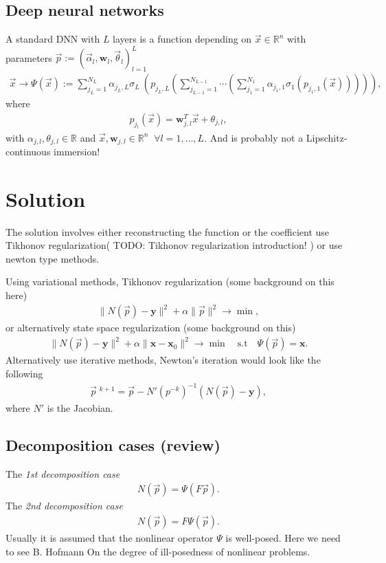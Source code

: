 \subsection{Deep neural networks}
A standard DNN with $L$ layers is a function depending on $\vec{x} \in
\mathbb{R}^{n}$ with parameters $\vec{p}:=\left( \vec{\alpha}_l,
\mathbf{w}_l, \vec{\theta}_l  \right)_{l=1}^{L}$
\begin{align}
    \vec{x}\to\Psi(\vec{x}) := \sum_{j_L=1}^{N_L} \alpha_{j_L,L}\sigma_L\
    \left( p_{j_L, L} \left( \sum_{j_{L-1}=1}^{N_{L-1}}\cdots
    \left( \sum_{j_1=1}^{N_1}\alpha_{j_1,1}\sigma_1\left(p_{j_1,1}(\vec{x})
    \right)  \right)  \right)  \right),
\end{align}
where
\begin{align}
    p_{j_l}(\vec{x}) = \mathbf{w}_{j, l}^{T}\vec{x} + \theta_{j,l},
\end{align}
with $\alpha_{j,l}, \theta_{j,l} \in \mathbb{R}$ and $\vec{x},
\mathbf{w}_{j,l} \in \mathbb{R}^{n} \;\; \forall l=1,\ldots,L$. And is
probably not a Lipschitz-continuous immersion!


\section{Solution}
The solution involves either reconstructing the function or the coefficient use
Tikhonov regularization( TODO: Tikhonov regularization introduction! ) or use
newton type methods.

Using variational methods, Tikhonov regularization (some background on this
here)
\begin{align}
    \|N(\vec{p}) - \mathbf{y}\|^{2} + \alpha \|\vec{p}\|^{2} \to \min,
\end{align}
or alternatively state space regularization (some background on this)
\begin{align}
    \|N(\vec{p}) - \mathbf{y}\|^{2}
    + \alpha \|\mathbf{x} - \mathbf{x}_0\|^{2}
    \to \min \quad \text{s.t} \quad \Psi(\vec{p}) = \mathbf{x}.
\end{align}
Alternatively use iterative methods, Newton's iteration would look like the
following
\begin{align}
    \vec{p}\;^{k+1} = \vec{p} - N'\left(p^{-k}\right)^{-1}\left(N(\vec{p}) -
    \mathbf{y}  \right),
\end{align}
where $N'$ is the Jacobian.
\subsection{Decomposition cases (review)}
The \textit{1st decomposition case}
\begin{align}
    N(\vec{p}) = \Psi(F\vec{p}).
\end{align}
The \textit{2nd decomposition case}
\begin{align}
    N(\vec{p}) = F\Psi(\vec{p}).
\end{align}
Usually it is assumed that the nonlinear operator $\Psi$ is well-posed.
Here we need to see B. Hofmann On the degree of ill-posedness of nonlinear
problems.
